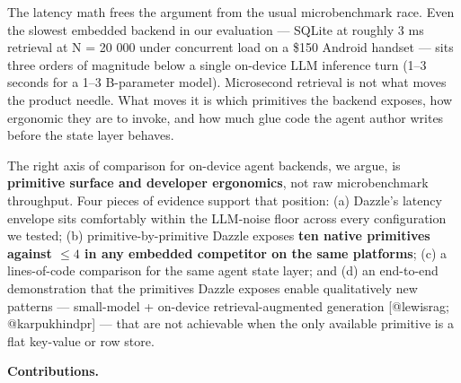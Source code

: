 The latency math frees the argument from the usual microbenchmark race. Even the
slowest embedded backend in our evaluation --- SQLite at roughly 3 ms retrieval
at N = 20 000 under concurrent load on a \$150 Android handset --- sits three
orders of magnitude below a single on-device LLM inference turn (1--3 seconds
for a 1--3 B-parameter model). Microsecond retrieval is not what moves the
product needle. What moves it is which primitives the backend exposes, how
ergonomic they are to invoke, and how much glue code the agent author writes
before the state layer behaves.

The right axis of comparison for on-device agent backends, we argue, is
\textbf{primitive surface and developer ergonomics}, not raw microbenchmark
throughput. Four pieces of evidence support that position: (a) Dazzle's latency
envelope sits comfortably within the LLM-noise floor across every configuration
we tested; (b) primitive-by-primitive Dazzle exposes \textbf{ten native
primitives against \(\leq 4\) in any embedded competitor on the same platforms};
(c) a lines-of-code comparison for the same agent state layer; and (d) an
end-to-end demonstration that the primitives Dazzle exposes enable qualitatively
new patterns --- small-model + on-device retrieval-augmented generation
{[}@lewisrag; @karpukhindpr{]} --- that are not achievable when the only
available primitive is a flat key-value or row store.

\textbf{Contributions.}

